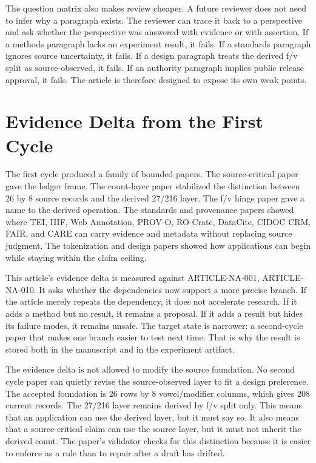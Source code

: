 \documentclass[sigconf,nonacm]{acmart}
\begin{document}
The question matrix also makes review cheaper. A future reviewer does not need
to infer why a paragraph exists. The reviewer can trace it back to a perspective
and ask whether the perspective was answered with evidence or with assertion.
If a methods paragraph lacks an experiment result, it fails. If a standards
paragraph ignores source uncertainty, it fails. If a design paragraph treats the
derived f/v split as source-observed, it fails. If an authority paragraph implies
public release approval, it fails. The article is therefore designed to expose
its own weak points.

\section{Evidence Delta from the First Cycle}
The first cycle produced a family of bounded papers. The source-critical paper
gave the ledger frame. The count-layer paper stabilized the distinction between
26 by 8 source records and the derived 27/216 layer. The f/v hinge paper gave a
name to the derived operation. The standards and provenance papers showed where
TEI, IIIF, Web Annotation, PROV-O, RO-Crate, DataCite, CIDOC CRM, FAIR, and CARE
can carry evidence and metadata without replacing source judgment. The
tokenization and design papers showed how applications can begin while staying
within the claim ceiling.

This article's evidence delta is measured against ARTICLE-NA-001, ARTICLE-NA-010. It asks whether the
dependencies now support a more precise branch. If the article merely repeats
the dependency, it does not accelerate research. If it adds a method but no
result, it remains a proposal. If it adds a result but hides its failure modes,
it remains unsafe. The target state is narrower: a second-cycle paper that makes
one branch easier to test next time. That is why the result is stored both in
the manuscript and in the experiment artifact.

The evidence delta is not allowed to modify the source foundation. No second
cycle paper can quietly revise the source-observed layer to fit a design
preference. The accepted foundation is 26 rows by 8 vowel/modifier columns,
which gives 208 current records. The 27/216 layer remains derived by f/v split
only. This means that an application can use the derived layer, but it must say
so. It also means that a source-critical claim can use the source layer, but it
must not inherit the derived count. The paper's validator checks for this
distinction because it is easier to enforce as a rule than to repair after a
draft has drifted.
\end{document}
